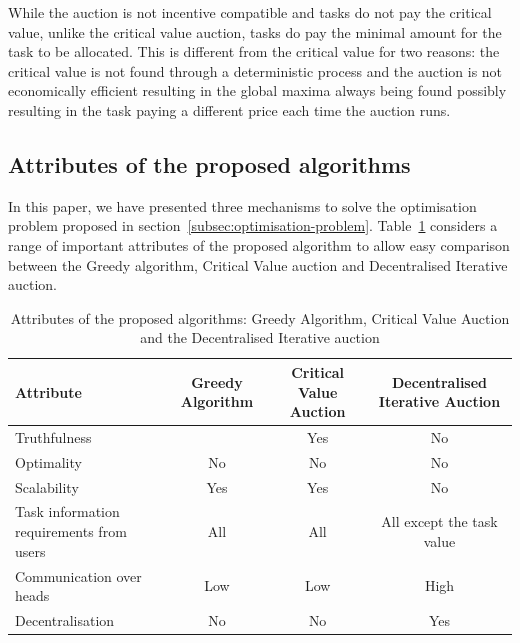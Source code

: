 While the auction is not incentive compatible and tasks do not pay the critical value, unlike the critical value
auction, tasks do pay the minimal amount for the task to be allocated. This is different from the critical value for
two reasons: the critical value is not found through a deterministic process and the auction is not economically
efficient resulting in the global maxima always being found possibly resulting in the task paying a different price
each time the auction runs.

\subsection{Attributes of the proposed algorithms}
\label{subsec:attributes-of-proposed-algorithms}
In this paper, we have presented three mechanisms to solve the optimisation problem proposed in
section~\ref{subsec:optimisation-problem}. Table~\ref{tab:attributes_algorithms} considers a range of
important attributes of the proposed algorithm to allow easy comparison between the Greedy algorithm,
Critical Value auction and Decentralised Iterative auction.

\begin{table}[H]
    \caption{Attributes of the proposed algorithms: Greedy Algorithm, Critical Value Auction and the
    Decentralised Iterative auction}
    \begin{tabular}{|p{3cm}|c|c|c|}
        \hline
        \textbf{Attribute} & Greedy Algorithm & Critical Value Auction & Decentralised Iterative Auction \\ \hline
        Truthfulness & & Yes & No \\ \hline
        Optimality & No  & No & No \\ \hline
        Scalability & Yes & Yes & No \\ \hline
        Task information requirements from users & All & All & All except the task value \\ \hline
        Communication over heads & Low & Low & High \\ \hline
        Decentralisation & No  & No  & Yes \\ \hline
    \end{tabular}
    \label{tab:attributes_algorithms}
\end{table}
